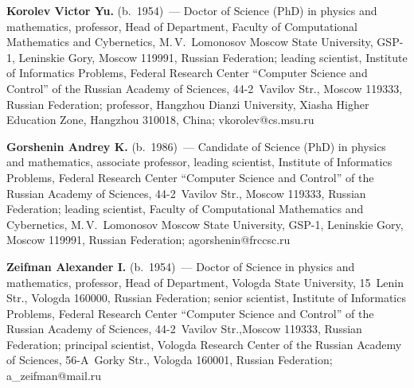 \noindent
\textbf{Korolev Victor Yu.} (b.\ 1954)~--- 
Doctor of Science (PhD) in physics and
mathematics, professor, Head of Department, Faculty of Computational Mathematics 
and Cybernetics, M.\,V.~Lomonosov Moscow State University, GSP-1, Leninskie Gory, 
Moscow 119991, Russian Federation; leading scientist, 
Institute of Informatics Problems, Federal Research Center 
``Computer Science and Control'' of the Russian Academy of Sciences, 
44-2~Vavilov Str., Moscow 119333, Russian Federation; 
professor, Hangzhou Dianzi University, Xiasha Higher Education Zone, 
Hangzhou 310018, China; \mbox{vkorolev@cs.msu.ru}

\vspace*{1pt}

\noindent
\textbf{Gorshenin Andrey K.} (b.\ 1986)~--- Candidate of Science (PhD) in physics and
mathematics, associate professor, leading scientist, Institute of Informatics Problems,
Federal Research Center ``Computer Science and Control'' of the Russian Academy of
Sciences, 44-2~Vavilov Str., Moscow 119333, Russian Federation;  
leading scientist, Faculty of Computational Mathematics and Cybernetics, 
M.\,V.~Lomonosov Moscow State University, GSP-1, Leninskie Gory, Moscow 119991, 
Russian Federation; \mbox{agorshenin@frccsc.ru}

\vspace*{1pt}

\noindent
\textbf{Zeifman Alexander I.} (b.\ 1954)~--- 
Doctor of Science in physics and mathematics, professor, Head of Department, 
Vologda State University, 15~Lenin Str., Vologda 160000, Russian Federation; 
senior scientist, Institute of Informatics Problems, Federal Research Center 
``Computer Science and Control'' of the Russian Academy of Sciences, 
44-2~Vavilov Str.,Moscow 119333, Russian Federation; 
principal scientist, Vologda Research Center of the Russian Academy of Sciences, 
56-A~Gorky Str., Vologda 160001, Russian Federation; \mbox{a\_zeifman@mail.ru}
\label{end\stat}

\renewcommand{\bibname}{\protect\rm Литература}       